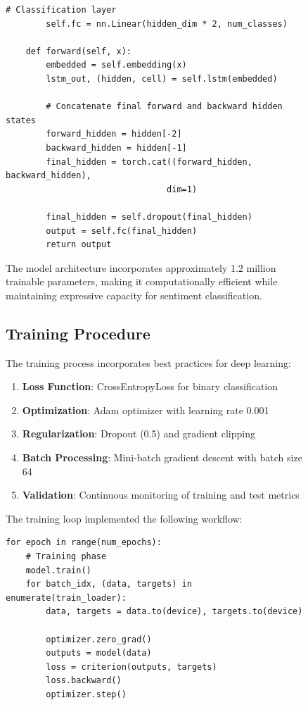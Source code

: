 \documentclass[a4paper, journal]{IEEEtran}
\begin{document}
\begin{figure}[!t]
\begin{lstlisting}[caption=LSTM Model Architecture]
        # Classification layer
        self.fc = nn.Linear(hidden_dim * 2, num_classes)
    
    def forward(self, x):
        embedded = self.embedding(x)
        lstm_out, (hidden, cell) = self.lstm(embedded)
        
        # Concatenate final forward and backward hidden states
        forward_hidden = hidden[-2]
        backward_hidden = hidden[-1]
        final_hidden = torch.cat((forward_hidden, backward_hidden), 
                                dim=1)
        
        final_hidden = self.dropout(final_hidden)
        output = self.fc(final_hidden)
        return output
\end{lstlisting}

The model architecture incorporates approximately 1.2 million trainable parameters, making it computationally efficient while maintaining expressive capacity for sentiment classification.

\subsection{Training Procedure}

The training process incorporates best practices for deep learning:

\begin{enumerate}
    \item \textbf{Loss Function}: CrossEntropyLoss for binary classification
    \item \textbf{Optimization}: Adam optimizer with learning rate 0.001
    \item \textbf{Regularization}: Dropout (0.5) and gradient clipping
    \item \textbf{Batch Processing}: Mini-batch gradient descent with batch size 64
    \item \textbf{Validation}: Continuous monitoring of training and test metrics
\end{enumerate}

The training loop implemented the following workflow:

\begin{lstlisting}[caption=Training Loop Implementation]
for epoch in range(num_epochs):
    # Training phase
    model.train()
    for batch_idx, (data, targets) in enumerate(train_loader):
        data, targets = data.to(device), targets.to(device)
        
        optimizer.zero_grad()
        outputs = model(data)
        loss = criterion(outputs, targets)
        loss.backward()
        optimizer.step()
    

\end{lstlisting}
\end{figure}
\end{document}

